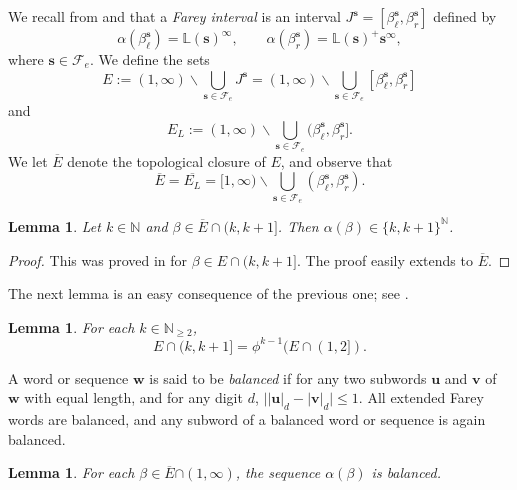 \documentclass[11pt]{amsart}
\newtheorem{lemma}[theorem]{Lemma}
\theoremstyle{definition}
\theoremstyle{remark}
\numberwithin{equation}{section}
\newcommand{\N}{\ensuremath{\mathbb{N}}}
\renewcommand{\L}{\ensuremath{\mathbb{L}}}
\newcommand{\cF}{\mathcal{F}}
\newcommand{\s}{ {\mathbf{s}}}
\renewcommand{\u}{\mathbf{u}}
\renewcommand{\v}{\mathbf{v}}
\newcommand{\w}{\mathbf{w}}
\newcommand{\f}{\infty}
\newcommand{\al}{\alpha}
\begin{document}
We recall from \cite{Kalle-Kong-Langeveld-Li-18} {and \cite{Allaart-Kong-2024}} that a {\em Farey interval} is an interval $J^\s=[\beta_\ell^{\s},\beta_r^{\s}]$ defined by
\[
\alpha(\beta_\ell^{\s})=\L(\s)^\f, \qquad \alpha(\beta_r^{\s})=\L(\s)^+\s^\f,
\]
where $\s\in{\cF_e}$. We define the sets
\[
E:={(1,\f)}\backslash \bigcup_{\s\in\cF_e} J^\s={(1,\f)}\backslash \bigcup_{\s\in\cF_e} [\beta_\ell^{\s},\beta_r^{\s}]
\]
and
\begin{equation} \label{eq:bifurction-E-L}
E_L:={(1,\f)}\backslash \bigcup_{\s\in\cF_e} (\beta_\ell^{\s},\beta_r^{\s}].
\end{equation}
We let $\overline{E}$ denote the topological closure of $E$, and observe that
\[
\overline{E}=\overline{E_L}={{[1,\f)}}\backslash \bigcup_{\s\in\cF_e} (\beta_\ell^{\s},\beta_r^{\s}).
\]

{
\begin{lemma} \label{lem:two-digits}
Let $k\in\N$ and $\beta\in \overline{E}\cap(k,k+1]$. Then $\al(\beta)\in \{k,k+1\}^\N$.
\end{lemma}

\begin{proof}
This was proved in \cite[Lemma 5.2]{Allaart-Kong-2024} for $\beta\in E\cap(k,k+1]$. The proof easily extends to $\overline{E}$.
\end{proof}

The next lemma is an easy consequence of the previous one; see \cite[Lemma 5.3]{Allaart-Kong-2024}.

\begin{lemma} \label{prop:image-of-E}
For each $k\in\N_{\geq 2}$,
\[
E\cap(k,k+1]=\phi^{k-1}(E\cap(1,2]).
\]
\end{lemma}
}

A word or sequence $\w$ is said to be {\em balanced} if for any two subwords $\u$ and $\v$ of $\w$ with equal length, {and for any digit $d$, $\big||\u|_d-|\v|_d\big|\leq 1$.}
All {extended} Farey words are balanced, and any subword of a balanced word or sequence is again balanced.

\begin{lemma} \label{lem:balanced-expansion}
For each $\beta\in \overline{E}{\cap{(1,\f)}}$, the sequence $\al(\beta)$ is balanced.
\end{lemma}
\end{document}
